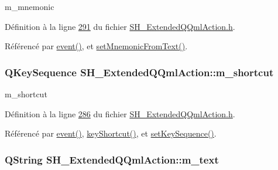 m\-\_\-mnemonic 



Définition à la ligne \hyperlink{SH__ExtendedQQmlAction_8h_source_l00291}{291} du fichier \hyperlink{SH__ExtendedQQmlAction_8h_source}{S\-H\-\_\-\-Extended\-Q\-Qml\-Action.\-h}.



Référencé par \hyperlink{classSH__ExtendedQQmlAction_a218053d85e9fc54e06ab39b1bb37dd4b}{event()}, et \hyperlink{classSH__ExtendedQQmlAction_a717e828cb0341e3d77eabe05e6143032}{set\-Mnemonic\-From\-Text()}.

\hypertarget{classSH__ExtendedQQmlAction_ac84d3a2113efb715321b905580b08bc5}{
\subsubsection[{m\-\_\-shortcut}]{\setlength{\rightskip}{0pt plus 5cm}Q\-Key\-Sequence S\-H\-\_\-\-Extended\-Q\-Qml\-Action\-::m\-\_\-shortcut\hspace{0.3cm}{\ttfamily [private]}}}\label{classSH__ExtendedQQmlAction_ac84d3a2113efb715321b905580b08bc5}


m\-\_\-shortcut 



Définition à la ligne \hyperlink{SH__ExtendedQQmlAction_8h_source_l00286}{286} du fichier \hyperlink{SH__ExtendedQQmlAction_8h_source}{S\-H\-\_\-\-Extended\-Q\-Qml\-Action.\-h}.



Référencé par \hyperlink{classSH__ExtendedQQmlAction_a218053d85e9fc54e06ab39b1bb37dd4b}{event()}, \hyperlink{classSH__ExtendedQQmlAction_a2efb60c1b33a04e8e58ef9184dccbd2d}{key\-Shortcut()}, et \hyperlink{classSH__ExtendedQQmlAction_a7d624821268cc19aa44bcda3cd85b967}{set\-Key\-Sequence()}.

\hypertarget{classSH__ExtendedQQmlAction_a8fd83c5e68691a582fa7e0c62d661c71}{
\subsubsection[{m\-\_\-text}]{\setlength{\rightskip}{0pt plus 5cm}Q\-String S\-H\-\_\-\-Extended\-Q\-Qml\-Action\-::m\-\_\-text\hspace{0.3cm}{\ttfamily [private]}}}\label{classSH__ExtendedQQmlAction_a8fd83c5e68691a582fa7e0c62d661c71}



